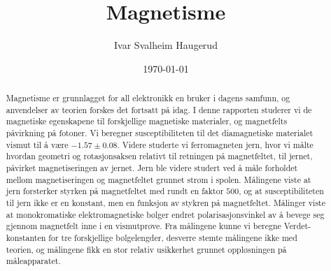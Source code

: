 \documentclass[%
 reprint,
 amsmath,amssymb,
 aps,
 norsk,
]{revtex4-1}
\begin{document}

\title{Magnetisme}%

\author{Ivar Svalheim Haugerud}

%

\date{\today}%

\begin{abstract}
Magnetisme er grunnlagget for all elektronikk en bruker i dagens samfunn, og anvendelser av teorien forskes det fortsatt på idag. I denne rapporten studerer vi de magnetiske egenskapene til forskjellige magnetiske materialer, og magnetfelts påvirkning på fotoner. Vi beregner susceptibiliteten til det diamagnetiske materialet vismut til å være $-1.57\pm0.08$.
Videre studerte vi ferromagneten jern, hvor vi målte hvordan geometri og rotasjonsaksen relativt til retningen på magnetfeltet, til jernet, påvirket magnetiseringen av jernet. Jern ble videre studert ved å måle forholdet mellom magnetiseringen og magnetfeltet grunnet strøm i spolen. Målingene viste at jern forsterker styrken på magnetfeltet med rundt en faktor $500$, og at susceptibiliteten til jern ikke er en konstant, men en funksjon av stykren på magnetfeltet. Målinger viste at monokromatiske elektromagnetiske bølger endret polarisasjonsvinkel av å bevege seg gjennom magnetfelt inne i en vismutprøve. Fra målingene kunne vi beregne Verdet-konstanten for tre forskjellige bølgelengder, desverre stemte målingene ikke med teorien, og målingene fikk en stor relativ usikkerhet grunnet oppløsningen på måleapparatet.
\end{abstract}

\maketitle

\end{document}
